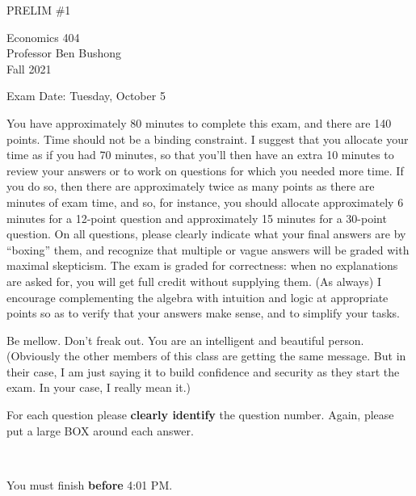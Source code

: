 \documentclass[12pt]{article}
\theoremstyle{definition}
\begin{document}
\begin{center}
PRELIM \#1

\vspace*{.25in}

Economics 404\\[0pt]
Professor Ben Bushong\\[0pt]
Fall 2021

\vspace*{.25in}

Exam Date: Tuesday, October 5
\end{center}

\vspace*{.1in}
\singlespacing
You have approximately 80 minutes to complete this exam, and there are 140 points. Time should not be a binding constraint. I suggest that you allocate your time as if you had 70 minutes, so that you'll then have an extra 10 minutes to review your answers or to work on questions for which you needed more time. If you do so, then there are approximately twice as many points as there are minutes of exam time, and so, for instance, you should allocate approximately 6 minutes for a 12-point question and approximately 15 minutes for a 30-point question. On all questions, please clearly indicate what your final answers are by ``boxing” them, and recognize that multiple or vague answers will be graded with maximal skepticism. The exam is graded for correctness: when no explanations are asked for, you will get full credit without supplying them. (As always) I encourage complementing the algebra with intuition and logic at appropriate points so as to verify that your answers make sense, and to simplify your tasks.

\vspace*{.3in}

Be mellow. Don’t freak out. You are an intelligent and beautiful person. (Obviously the other members of this class are getting the same message. But in their case, I am just saying it to build confidence and security as they start the exam. In your case, I really mean it.)

{\centering \noindent For each question please \textbf{clearly identify} the question number. Again, please put a large BOX around each answer. \par
}

~

\noindent You must finish \textbf{before} 4:01 PM. 

\bigskip

\bigskip
\end{document}
